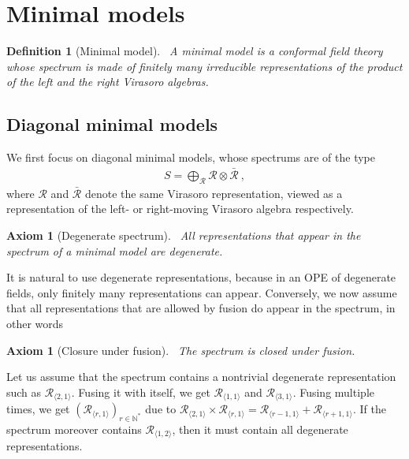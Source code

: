 \documentclass[12pt, a4paper]{article}
\theoremstyle{break}
\newtheorem{hyp}[exo]{Axiom}
\newtheorem{defn}[exo]{Definition}
\begin{document}
\section{Minimal models}

\begin{defn}[Minimal model]
 ~\label{def:mm}
 A minimal model is a conformal field theory whose spectrum is made of finitely many irreducible representations of the product of the left and the right Virasoro algebras.
\end{defn}

\subsection{Diagonal minimal models}\label{sec:amm}

We first focus on diagonal minimal models, whose spectrums are of the type
\begin{align}
 S = \bigoplus_\mathcal{R} \mathcal{R}\otimes  \mathcal{\bar R}\ ,
\end{align}
where $\mathcal{R}$ and $ \mathcal{\bar R}$ denote the same Virasoro representation, viewed as a representation of the left- or right-moving Virasoro algebra respectively.

\begin{hyp}[Degenerate spectrum]
 ~\label{hyp:deg}
 All representations that appear in the spectrum of a minimal model are degenerate.
\end{hyp}
It is natural to use degenerate representations, because in an OPE of degenerate fields, only finitely many representations can appear. Conversely, we now assume that all representations that are allowed by fusion do appear in the spectrum, in other words

\begin{hyp}[Closure under fusion]
 ~\label{hyp:stab}
 The spectrum is closed under fusion. 
\end{hyp}

Let us assume that the spectrum contains a nontrivial degenerate representation such as $\mathcal{R}_{\langle 2,1\rangle}$. Fusing it with itself, we get $\mathcal{R}_{\langle 1, 1\rangle}$ and $\mathcal{R}_{\langle 3,1\rangle}$. Fusing multiple times, we get $(\mathcal{R}_{\langle r, 1\rangle})_{r\in\mathbb{N}^*}$ due to $\mathcal{R}_{\langle 2,1\rangle} \times \mathcal{R}_{\langle r,1\rangle} = \mathcal{R}_{\langle r-1,1\rangle}  + \mathcal{R}_{\langle r+1,1\rangle}$. If the spectrum moreover contains $\mathcal{R}_{\langle 1,2\rangle}$, then it must contain all degenerate representations. 
\end{document}

